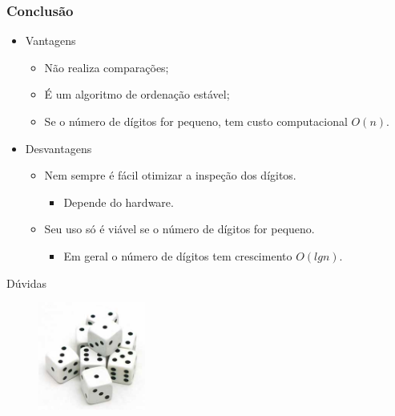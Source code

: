 \documentclass[aspectratio=169]{beamer}
\begin{document}
\begin{frame}
\frametitle{Conclusão}
\begin{itemize}
\item Vantagens
\begin{itemize}
 \item Não realiza comparações; 
 \item É um algoritmo de ordenação estável;
 \item Se o número de dígitos for pequeno, tem custo computacional $O(n)$.
\end{itemize}
\item Desvantagens
\begin{itemize}
\item Nem sempre é fácil otimizar a inspeção dos dígitos.
\begin{itemize}
\item Depende do hardware.
\end{itemize}
\item Seu uso só é viável se o número de dígitos for pequeno.
\begin{itemize}
\item Em geral o número de dígitos tem crescimento $O(lgn)$.
\end{itemize}
\end{itemize}
\end{itemize}
\end{frame}



\begin{frame}
\Huge{\centerline{Dúvidas}}

\begin{figure}[!h]
  \centering
  \includegraphics[width=100pt]{imgs/dados.jpg}
  \label{fig_fim}
\end{figure}
\end{frame}
\end{document}
